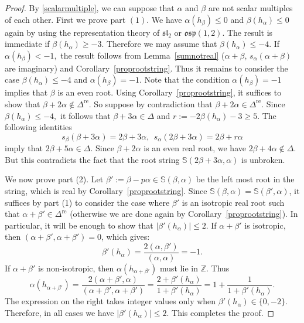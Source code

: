 \documentclass[11pt,reqno]{amsart}
\theoremstyle{plain}
\theoremstyle{definition}
\theoremstyle{remark}
\numberwithin{equation}{section}
\begin{document}
\begin{proof} By \eqref{scalarmultiple}, we can suppose that $\alpha$ and $\beta$ are not scalar multiples of each other.
    First we prove part $(1).$ We have $\alpha(h_\beta)\le 0$ and $\beta(h_\alpha)\le 0$ again by using the representation theory of $\mathfrak{sl}_2$ or $\mathfrak{osp}(1,2)$. The result is immediate if $\beta(h_\alpha)\geq -3$. Therefore we may assume that $\beta(h_\alpha)\le -4.$ If $\alpha(h_\beta)<-1,$ the result follows from Lemma~\ref{sumnotreal} ($\alpha+\beta$, $s_{\alpha}(\alpha+\beta)$ are imaginary) and Corollary~\ref{proprootstring}. Thus it remains to consider the case $\beta(h_\alpha)\le -4$ and $\alpha(h_\beta)=-1$. Note that the condition $\alpha(h_\beta)=-1$ implies that $\beta$ is an even root. Using Corollary~\ref{proprootstring}, it suffices to show that $\beta+2\alpha\notin \Delta^{\mathrm{re}}$. So suppose by contradiction that $\beta+2\alpha\in \Delta^{\mathrm{re}}.$ Since $\beta(h_\alpha)\le -4,$ it follows that $\beta+3\alpha\in \Delta$ and $r:=-2\beta(h_\alpha)-3\geq 5$. The following identities
    $$s_{\beta}(\beta+3\alpha)=2\beta+3\alpha,\ \ s_\alpha(2\beta+3\alpha)=2\beta+r\alpha$$
    imply that $2\beta+5\alpha\in \Delta.$ Since $\beta+2\alpha$ is an even real root, we have $2\beta+4\alpha\notin \Delta.$ But this contradicts the fact that the root string $\mathbb{S}(2\beta+3\alpha,\alpha)$ is unbroken.

    We now prove part (2). Let $\beta':=\beta-p\alpha\in \mathbb{S}(\beta,\alpha)$ be the left most root in the string, which is real by Corollary~\ref{proprootstring}. Since $\mathbb{S}(\beta,\alpha)=\mathbb{S}(\beta',\alpha)$, it suffices by part (1) to consider the case where $\beta'$ is an isotropic real root such that $\alpha + \beta' \in \Delta^{\mathrm{re}}$ (otherwise we are done again by Corollary~\ref{proprootstring}). In particular, it will be enough to show that $|\beta'(h_\alpha)| \le 2$.
    If $\alpha+\beta'$ is isotropic, then $(\alpha + \beta', \alpha + \beta') = 0$, which gives:
    $$\beta'(h_\alpha)=\frac{2(\alpha,\beta')}{(\alpha,\alpha)}=-1.$$
    If $\alpha + \beta'$ is non-isotropic, then $\alpha(h_{\alpha + \beta'})$ must lie in $\mathbb{Z}$. Thus
    $$\alpha(h_{\alpha+\beta'})=\frac{2(\alpha+\beta',\alpha)}{(\alpha+\beta',\alpha+\beta')}=\frac{2+\beta'(h_\alpha)}{1+\beta'(h_\alpha)}=1+\frac{1}{1+\beta'(h_\alpha)}.$$
    The expression on the right takes integer values only when $\beta'(h_\alpha) \in\{0,-2\}$. Therefore, in all cases we have $|\beta'(h_\alpha)| \le 2$. This completes the proof.
\end{proof}
\end{document}
